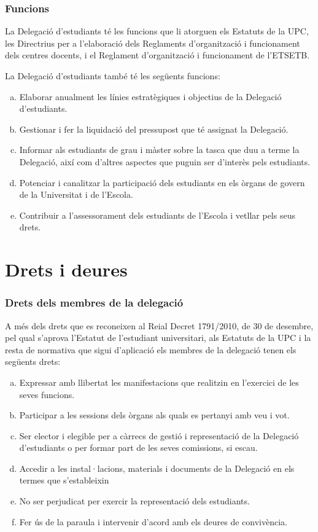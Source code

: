 \documentclass[a4paper,12pt]{article}
\begin{document}
\subsubsection{Funcions}\label{art:funcions}
La Delegació d'estudiants té les funcions que li atorguen els Estatuts de la UPC, les Directrius per a l'elaboració dels Reglaments d'organització i funcionament dels centres docents, i el Reglament d'organització i funcionament de l'ETSETB.

La Delegació d'estudiants també té les següents funcions:
\begin{enumerate}[a)]
	\item Elaborar anualment les línies estratègiques i objectius de la Delegació d'estudiants.
	\item Gestionar i fer la liquidació del pressupost que té assignat la Delegació.
	\item Informar als estudiants de grau i màster sobre la tasca que duu a terme la Delegació, així com d'altres aspectes que puguin ser d'interès pels estudiants.
	\item Potenciar i canalitzar la participació dels estudiants en els òrgans de govern de la Universitat i de l'Escola.
	\item Contribuir a l'assessorament dels estudiants de l'Escola i vetllar pels seus drets.
\end{enumerate}

\section{Drets i deures}
\subsubsection{Drets dels membres de la delegació}
A més dels drets que es reconeixen al Reial Decret 1791/2010, de 30 de desembre, pel qual s'aprova l'Estatut de l'estudiant universitari, als Estatuts de la UPC i la resta de normativa que sigui d'aplicació els membres de la delegació tenen els següents drets:

\begin{enumerate}[a)]
	\item Expressar amb llibertat les manifestacions que realitzin en l'exercici de les seves funcions.
	\item Participar a les sessions dels òrgans als quals es pertanyi amb veu i vot.
	\item Ser elector i elegible per a càrrecs de gestió i representació de la Delegació d'estudiants o per formar part de les seves comissions, si escau.
	\item Accedir a les instal·lacions, materials i documents de la Delegació en els termes que s'estableixin
	\item No ser perjudicat per exercir la representació dels estudiants.
	\item Fer ús de la paraula i intervenir d'acord amb els deures de convivència.
\end{enumerate}
\end{document}
